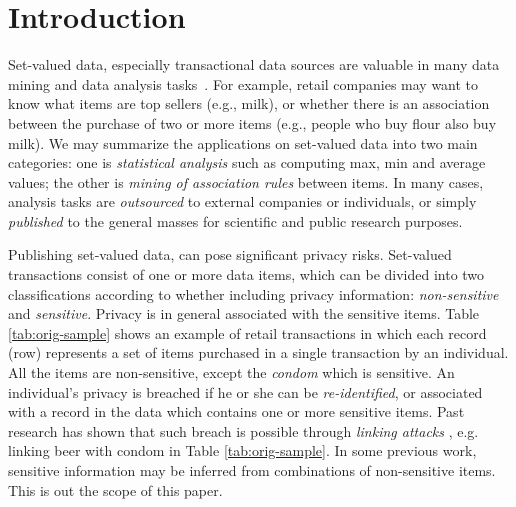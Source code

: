 \section{Introduction}
\label{sec:intro}

Set-valued data, especially transactional data sources are valuable in many data mining and data analysis 
tasks~\cite{agrawal1994fast,cui2002probabilistic,adar2007we}. 
For example, retail companies may want to know what items are top sellers (e.g., milk), or whether there is an association between the purchase of 
two or more items (e.g., people who buy flour also buy milk).
We may summarize the applications on set-valued data into two main categories: 
one is {\em statistical analysis} such as computing max, min and 
average values; the other is {\em mining of association rules} between items.
In many cases, analysis tasks are {\em outsourced} to external companies 
or individuals, or simply {\em published} to the general masses for 
scientific and public research purposes.

Publishing set-valued data, can pose significant privacy risks. Set-valued transactions consist of one or more data items, which can be divided into two classifications according to whether including privacy information: {\em non-sensitive} and {\em sensitive}. Privacy is in general associated with the sensitive items. Table \ref{tab:orig-sample} shows an example of retail transactions in which each record (row) represents a set of items purchased in a single transaction by an individual. All the items are non-sensitive, except the {\em condom} which is sensitive. An individual's privacy is breached if he or she can be {\em re-identified}, or associated with a record in the data which contains one or more sensitive items.
Past research has shown that such breach is possible through {\em linking attacks} \cite{FungWCY10:Survey,samarati1998}, e.g. linking beer with condom in Table \ref{tab:orig-sample}.
In some previous work, sensitive information may be inferred from
combinations of non-sensitive items. This is out the scope of this paper.


